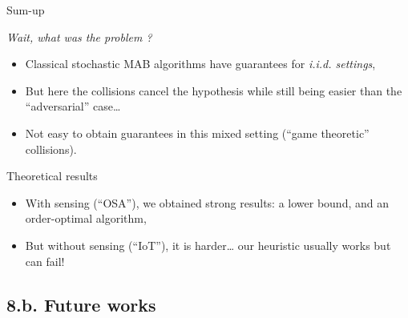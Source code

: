 \documentclass[12pt,english,ignorenonframetext,aspectratio=169,]{beamer}
\providecommand{\tightlist}{%
  \setlength{\itemsep}{0pt}\setlength{\parskip}{0pt}}
\begin{document}
\begin{frame}{Sum-up}

\begin{block}{\emph{Wait, what was the problem ?}}

\begin{itemize}
\tightlist
\item
  Classical stochastic MAB algorithms have guarantees for \emph{i.i.d. settings},
\item
  But here the collisions cancel the \iid{} hypothesis
  while still being easier than the ``adversarial'' case\ldots{}
\item
  Not easy to obtain guarantees in this mixed setting
  (``game theoretic'' collisions).
\end{itemize}

\pause

\end{block}

\begin{block}{Theoretical results}

\begin{itemize}
\tightlist
\item
  With sensing (``OSA''), we obtained strong results:\newline
  a lower bound, and an order-optimal algorithm,
\item
  But without sensing (``IoT''), it is harder\ldots{}\newline
  our heuristic \Selfish{} usually works but can fail!
\end{itemize}

\end{block}

\end{frame}



\subsection{\hfill{}8.b. Future works\hfill{}}
\end{document}
